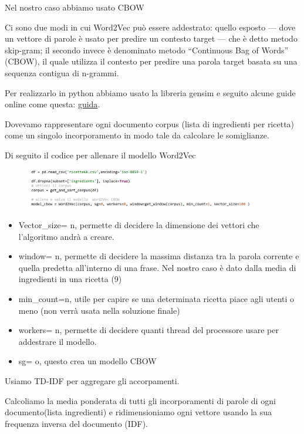 \documentclass[12pt]{report}
\begin{document}
Nel nostro caso abbiamo usato CBOW

Ci sono due modi in cui Word2Vec può essere addestrato: quello esposto — dove un vettore di parole è usato per predire un contesto target — che è detto metodo skip-gram; il secondo invece è denominato metodo “Continuous Bag of Words” (CBOW), il quale utilizza il contesto per predire una parola target basata su una sequenza contigua di n-grammi.

Per realizzarlo in python abbiamo usato la libreria gensim e seguito alcune guide online come questa: \href{http://nadbordrozd.github.io/blog/2016/05/20/text-classification-with-word2vec/}{guida}.

Dovevamo rappresentare ogni documento corpus (lista di ingredienti per ricetta) come un singolo incorporamento in modo tale da calcolare le somiglianze.

Di seguito il codice per allenare il modello Word2Vec

\begin{figure}[H]
        \centering
        {\includegraphics[width=0.9\textwidth]{img/img14.jpg}}
\end{figure}

\begin{itemize}
	\item Vector\_size= n, permette di decidere la dimensione dei vettori che l'algoritmo andrà a creare.
	\item window= n, permette di decidere la massima distanza tra la parola corrente e quella predetta all'interno di una frase. Nel nostro caso è dato dalla media di ingredienti in una ricetta (9)
	\item min\_count=n, utile per capire se una determinata ricetta piace agli utenti o meno (non verrà usata nella soluzione finale)
	\item workers= n, permette di decidere quanti thread del processore usare per addestrare il modello.
	\item sg= o, questo crea un modello CBOW
 \end{itemize}

Usiamo TD-IDF per aggregare gli accorpamenti.

Calcoliamo la media ponderata di tutti gli incorporamenti di parole di ogni documento(lista ingredienti) e ridimensioniamo ogni vettore usando la sua frequenza inversa del documento (IDF).
\end{document}
